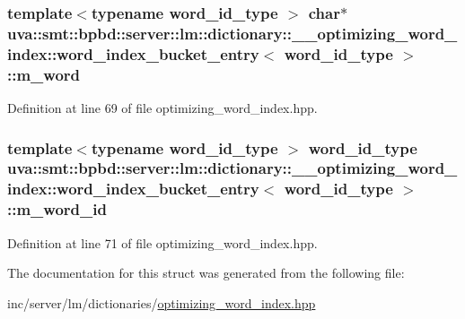 \subsubsection[{m\+\_\+word}]{\setlength{\rightskip}{0pt plus 5cm}template$<$typename word\+\_\+id\+\_\+type $>$ char$\ast$ {\bf uva\+::smt\+::bpbd\+::server\+::lm\+::dictionary\+::\+\_\+\+\_\+optimizing\+\_\+word\+\_\+index\+::word\+\_\+index\+\_\+bucket\+\_\+entry}$<$ word\+\_\+id\+\_\+type $>$\+::m\+\_\+word}\label{structuva_1_1smt_1_1bpbd_1_1server_1_1lm_1_1dictionary_1_1____optimizing__word__index_1_1word__index__bucket__entry_a3eed73a042cf4250d82892ce3c714d3f}


Definition at line 69 of file optimizing\+\_\+word\+\_\+index.\+hpp.

\hypertarget{structuva_1_1smt_1_1bpbd_1_1server_1_1lm_1_1dictionary_1_1____optimizing__word__index_1_1word__index__bucket__entry_a51dbc0341037d8ef0059b18dad893ba1}{}
\subsubsection[{m\+\_\+word\+\_\+id}]{\setlength{\rightskip}{0pt plus 5cm}template$<$typename word\+\_\+id\+\_\+type $>$ word\+\_\+id\+\_\+type {\bf uva\+::smt\+::bpbd\+::server\+::lm\+::dictionary\+::\+\_\+\+\_\+optimizing\+\_\+word\+\_\+index\+::word\+\_\+index\+\_\+bucket\+\_\+entry}$<$ word\+\_\+id\+\_\+type $>$\+::m\+\_\+word\+\_\+id}\label{structuva_1_1smt_1_1bpbd_1_1server_1_1lm_1_1dictionary_1_1____optimizing__word__index_1_1word__index__bucket__entry_a51dbc0341037d8ef0059b18dad893ba1}


Definition at line 71 of file optimizing\+\_\+word\+\_\+index.\+hpp.



The documentation for this struct was generated from the following file\+:\begin{DoxyCompactItemize}
\item 
inc/server/lm/dictionaries/\hyperlink{optimizing__word__index_8hpp}{optimizing\+\_\+word\+\_\+index.\+hpp}\end{DoxyCompactItemize}

